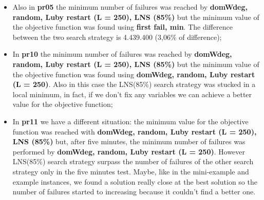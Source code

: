 \begin{itemize}
    \item Also in \textbf{pr05} the minimum number of failures was reached by \textbf{domWdeg, random, Luby restart (L = 250), LNS (85\%)} but the minimum value of the objective function was found using \textbf{first fail, min}. The difference between the two search strategy is 4.439.400 (3,06\% of difference);
    \item In \textbf{pr10} the minimum number of failures was reached by \textbf{domWdeg, random, Luby restart (L = 250), LNS (85\%)} but the minimum value of the objective function was found using \textbf{domWdeg, random, Luby restart (L = 250)}. Also in this case the LNS(85\%) search strategy was stucked in a local minimum, in fact, if we don't fix any variables we can achieve a better value for the objective function;
    \item In \textbf{pr11} we have a different situation: the minimum value for the objective function was reached with \textbf{domWdeg, random, Luby restart (L = 250), LNS (85\%)} but, after five minutes, the minimum number of failures was performed by \textbf{domWdeg, random, Luby restart (L = 250)}. However LNS(85\%) search strategy surpass the number of failures of the other search strategy  only in the five minutes test. Maybe, like in the mini-example and example instances, we found a solution really close at the best solution so the number of failures started to increasing because it couldn't find a better one. 
\end{itemize}
